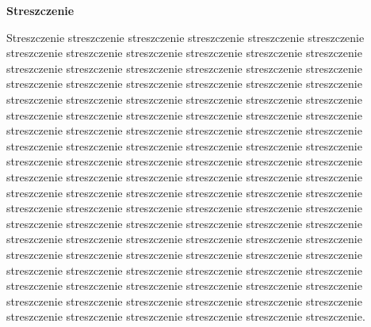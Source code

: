 \clearpage

\begin{center}
\textbf{Streszczenie}
\end{center}

Streszczenie streszczenie streszczenie streszczenie streszczenie streszczenie streszczenie streszczenie streszczenie streszczenie streszczenie streszczenie streszczenie streszczenie streszczenie streszczenie streszczenie streszczenie streszczenie streszczenie streszczenie streszczenie streszczenie streszczenie streszczenie streszczenie streszczenie streszczenie streszczenie streszczenie streszczenie streszczenie streszczenie streszczenie streszczenie streszczenie streszczenie streszczenie streszczenie streszczenie streszczenie streszczenie streszczenie streszczenie streszczenie streszczenie streszczenie streszczenie streszczenie streszczenie streszczenie streszczenie streszczenie streszczenie streszczenie streszczenie streszczenie streszczenie streszczenie streszczenie streszczenie streszczenie streszczenie streszczenie streszczenie streszczenie streszczenie streszczenie streszczenie streszczenie streszczenie streszczenie streszczenie streszczenie streszczenie streszczenie streszczenie streszczenie streszczenie streszczenie streszczenie streszczenie streszczenie streszczenie streszczenie streszczenie streszczenie streszczenie streszczenie streszczenie streszczenie streszczenie streszczenie streszczenie streszczenie streszczenie streszczenie streszczenie streszczenie streszczenie streszczenie streszczenie streszczenie streszczenie streszczenie streszczenie streszczenie streszczenie streszczenie streszczenie streszczenie streszczenie streszczenie streszczenie.
